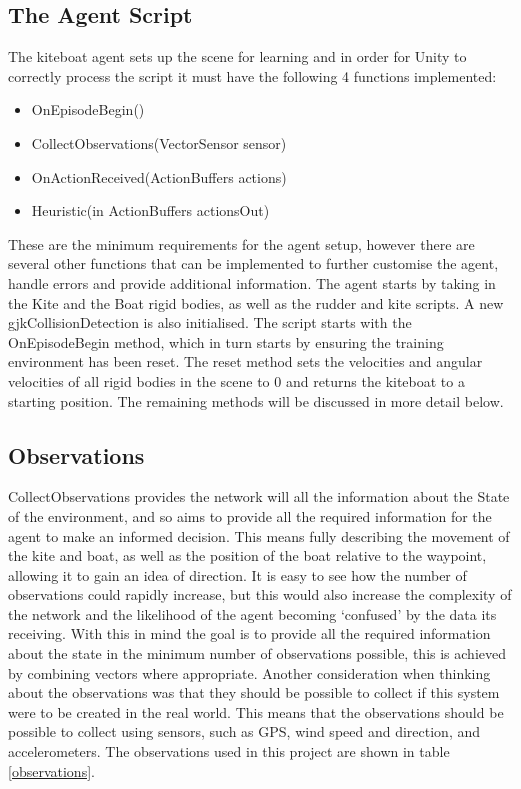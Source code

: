 \subsection{The Agent Script}\label{agent_script}
The kiteboat agent sets up the scene for learning and in order for Unity to correctly process the script it must have the following 4 functions implemented:
\begin{itemize}
    \item OnEpisodeBegin()
    \item CollectObservations(VectorSensor sensor)
    \item OnActionReceived(ActionBuffers actions)
    \item Heuristic(in ActionBuffers actionsOut)
\end{itemize}

These are the minimum requirements for the agent setup, however there are several other functions that can be implemented to further customise the agent, handle errors and provide additional information. The agent starts by taking in the Kite and the Boat rigid bodies, as well as the rudder and kite scripts. A new gjkCollisionDetection is also initialised. The script starts with the OnEpisodeBegin method, which in turn starts by ensuring the training environment has been reset. The reset method sets the velocities and angular velocities of all rigid bodies in the scene to 0 and returns the kiteboat to a starting position. The remaining methods will be discussed in more detail below.


\subsection{Observations}
CollectObservations provides the network will all the information about the State of the environment, and so aims to provide all the required information for the agent to make an informed decision. This means fully describing the movement of the kite and boat, as well as the position of the boat relative to the waypoint, allowing it to gain an idea of direction. It is easy to see how the number of observations could rapidly increase, but this would also increase the complexity of the network and the likelihood of the agent becoming `confused' by the data its receiving. With this in mind the goal is to provide all the required information about the state in the minimum number of observations possible, this is achieved by combining vectors where appropriate. Another consideration when thinking about the observations was that they should be possible to collect if this system were to be created in the real world. This means that the observations should be possible to collect using sensors, such as GPS, wind speed and direction, and accelerometers. The observations used in this project are shown in table$~$\ref{observations}.

